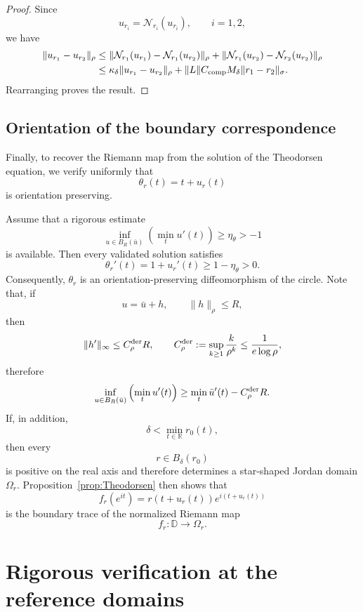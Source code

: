 \documentclass[11pt,a4paper]{amsart}
\begin{document}
\begin{proof}
	Since
	\[
	u_{r_i}
	=
	\mathcal N_{r_i}(u_{r_i}),
	\qquad i=1,2,
	\]
	we have
	\[
	\begin{aligned}
		\|u_{r_1}-u_{r_2}\|_\rho
		&\le\|\mathcal N_{r_1}(u_{r_1})-\mathcal N_{r_1}(u_{r_2})\|_\rho+
		\|\mathcal N_{r_1}(u_{r_2})-\mathcal N_{r_2}(u_{r_2})\|_\rho\\
		&\le\kappa_\delta\|u_{r_1}-u_{r_2}\|_\rho+\|L\|C_{\rm comp}M_\delta\|r_1-r_2\|_\sigma.
	\end{aligned}
	\]
	Rearranging proves the result.
\end{proof}


\subsection{Orientation of the boundary correspondence}

Finally, to recover the Riemann map from the solution of the
Theodorsen equation, we verify uniformly that
\[
\theta_r(t)=t+u_r(t)
\]
is orientation preserving.

Assume that a rigorous estimate
\begin{equation}\label{eq:orientation}
	\inf_{u\in B_R(\bar u)}\left(\min_t u'(t)\right)\ge\eta_\theta>-1
\end{equation}
is available. Then every validated solution satisfies
\[
\theta_r'(t)
=
1+u_r'(t)
\ge
1-\eta_\theta
>
0.
\]
Consequently, $\theta_r$ is an orientation-preserving diffeomorphism
of the circle.
Note that, if
\[
u=\bar u+h,\qquad \|h\|_\rho\le R,
\]
then
\[
\|h'\|_\infty
\le
C_{\rho}^{\rm der}R,
\qquad
C_{\rho}^{\rm der}:=
\sup_{k\ge1}\frac{k}{\rho^k}
\le \frac{1}{e\log\rho},
\]
therefore
\[
	\inf_{u\in B_R(\bar u)}\left(\min_t u'(t)\right)
	\ge\min_t \bar u'(t)-C_{\rho}^{\rm der}R.
\]
If, in addition,
\[
\delta
<
\min_{t\in\mathbb R}r_0(t),
\]
then every
\[
r\in B_\delta(r_0)
\]
is positive on the real axis and therefore determines a star-shaped
Jordan domain $\Omega_r$. Proposition~\ref{prop:Theodorsen} then
shows that
\[
f_r(e^{it})
=
r(t+u_r(t))e^{i(t+u_r(t))}
\]
is the boundary trace of the normalized Riemann map
\[
f_r:\mathbb D\longrightarrow\Omega_r.
\]

\section{Rigorous verification at the reference domains}
\label{sec:verification}
\end{document}

